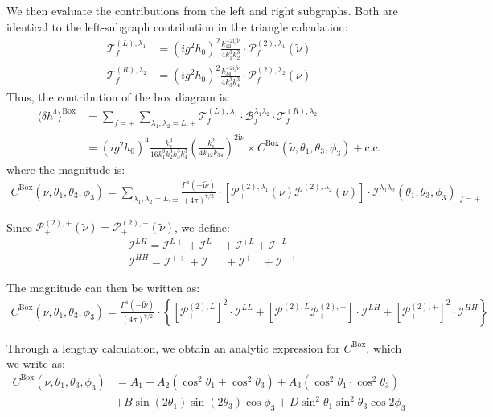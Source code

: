 \documentclass[a4paper,12pt]{article}
\def\mc{\mathcal}
\def\la{\langle}\def\ra{\rangle}
\def\ii{\mathrm{i}}
\def\lam{\lambda}
\def\tn{\tilde\nu}
\begin{document}
We then evaluate the contributions from the left and right subgraphs. Both are identical to the left-subgraph contribution in the triangle calculation:
\begin{align}
    \mathcal{T}^{(L),\lam_1}_f 
    &= \left( ig^2h_0\right)^2 
    \frac{k_{12}^{-2\ii f\tn}}{4k_1^3 k_2^3}
    \cdot \mathcal{P}_f^{(2),\lam_1}(\tn) \\
    \mathcal{T}^{(R),\lam_2}_f 
    &= \left( ig^2h_0\right)^2 
    \frac{k_{34}^{-2\ii f\tn}}{4k_3^3 k_4^3}
    \cdot \mathcal{P}_f^{(2),\lam_2}(\tn)
\end{align}
Thus, the contribution of the box diagram is:
\begin{align}
    \la \delta h^4 \ra^{\text{Box}} 
    &= \sum_{f=\pm} \sum_{\lam_1,\lam_2=L,\pm} 
    \mc T^{(L),\lambda_1}_f  
    \cdot \mc B^{\lam_1\lam_2}_f 
    \cdot \mc T^{(R),\lam_2}_f \\
    &= (ig^2h_0)^4 
    \frac{k_s^3}{16 k_1^3 k_2^3 k_3^3 k_4^3}
    \left( \frac{k_s^2}{4k_{12}k_{34}}\right)^{2\ii\tn} 
    \times C^{\text{Box}}(\tn,\theta_1,\theta_3,\phi_3) + \text{c.c.}
\end{align}
where the magnitude is:
\begin{align}
    C^{\text{Box}}(\tn,\theta_1,\theta_3,\phi_3) = 
    \sum_{\lam_1,\lam_2=L,\pm}
    \frac{\Gamma^4(-\ii \tn)}{(4\pi)^{7/2}} \cdot
    [\mathcal{P}^{(2),\lam_1}_+(\tn) \mc P^{(2),\lambda_2}_+(\tn) ]
    \cdot  
    \mathcal{I}^{\lambda_1\lam_2}(\theta_1,\theta_3,\phi_3)|_{f=+}
\end{align}

Since $\mathcal{P}^{(2),+}_+(\tn)=\mathcal{P}^{(2),-}_+(\tn)$, we define:
\begin{align}
    &\mathcal{I}^{LH} = \mc I^{L+} + \mc I^{L-} +\mc I^{+L} + \mc I^{-L} \\
    &\mathcal{I}^{HH} = \mc I^{++} + \mc I^{--} +\mc I^{+-} + \mc I^{-+}
\end{align}

The magnitude can then be written as:
\begin{align}
    C^{\text{Box}}(\tn,\theta_1,\theta_3,\phi_3) = 
    \frac{\Gamma^4(-\ii \tn)}{(4\pi)^{7/2}} \cdot
    \left\{
        [\mathcal{P}^{(2),L}_+]^2 \cdot  
        \mathcal{I}^{LL}
        + [\mathcal{P}^{(2),L}_+ \mc P^{(2),+}_+ ]\cdot  
        \mathcal{I}^{LH}
        + [\mathcal{P}^{(2),+}_+]^2 \cdot  
        \mathcal{I}^{HH}
    \right\}
\end{align}

Through a lengthy calculation, we obtain an analytic expression for $C^{\text{Box}}$, which we write as:
\begin{align}
    C^{\text{Box}}(\tn,\theta_1,\theta_3,\phi_3) &
    = A_1
    +A_2(\cos^2\theta_1 + \cos^2\theta_3)
    +A_3(\cos^2\theta_1 \cdot \cos^2\theta_3) \nonumber \\
    &+ B \sin(2\theta_1) \sin(2\theta_3) \cos \phi_3
    + D \sin^2\theta_1 \sin^2\theta_3 \cos 2\phi_3
\end{align}
\end{document}
